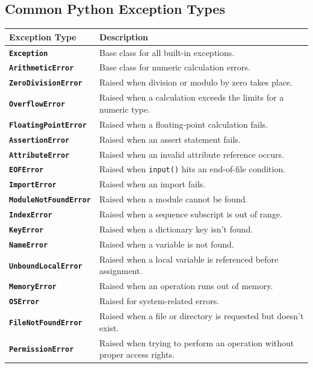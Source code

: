 \documentclass[a4paper,11pt]{article}
\begin{document}
		\vspace{1em}
		\subsection*{Common Python Exception Types}
		
		\renewcommand{\arraystretch}{1.5}
		\begin{tabular}{>{\bfseries}p{4cm} p{10cm}}
			\toprule
			Exception Type & Description \\
			\midrule
			\texttt{Exception} & Base class for all built-in exceptions. \\
			\texttt{ArithmeticError} & Base class for numeric calculation errors. \\
			\texttt{ZeroDivisionError} & Raised when division or modulo by zero takes place. \\
			\texttt{OverflowError} & Raised when a calculation exceeds the limits for a numeric type. \\
			\texttt{FloatingPointError} & Raised when a floating-point calculation fails. \\
			\texttt{AssertionError} & Raised when an assert statement fails. \\
			\texttt{AttributeError} & Raised when an invalid attribute reference occurs. \\
			\texttt{EOFError} & Raised when \texttt{input()} hits an end-of-file condition. \\
			\texttt{ImportError} & Raised when an import fails. \\
			\texttt{ModuleNotFoundError} & Raised when a module cannot be found. \\
			\texttt{IndexError} & Raised when a sequence subscript is out of range. \\
			\texttt{KeyError} & Raised when a dictionary key isn’t found. \\
			\texttt{NameError} & Raised when a variable is not found. \\
			\texttt{UnboundLocalError} & Raised when a local variable is referenced before assignment. \\
			\texttt{MemoryError} & Raised when an operation runs out of memory. \\
			\texttt{OSError} & Raised for system-related errors. \\
			\texttt{FileNotFoundError} & Raised when a file or directory is requested but doesn’t exist. \\
			\texttt{PermissionError} & Raised when trying to perform an operation without proper access rights. \\

\end{tabular}
\end{document}
